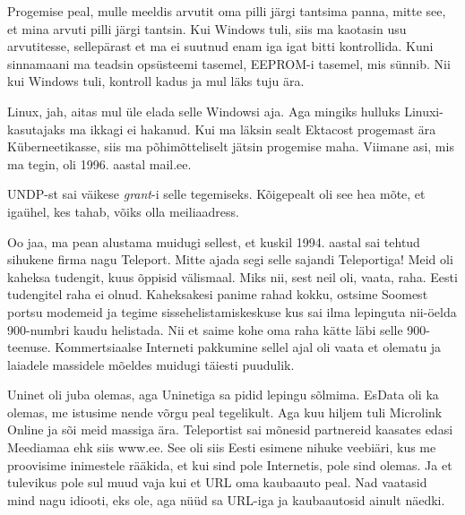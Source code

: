 
Progemise peal, mulle meeldis arvutit oma pilli järgi tantsima panna, mitte see, et mina arvuti pilli järgi tantsin. Kui  Windows tuli, siis ma kaotasin usu arvutitesse, sellepärast et ma ei suutnud enam iga igat bitti kontrollida. Kuni sinnamaani ma teadsin opsüsteemi tasemel,  EEPROM-i tasemel, mis sünnib. Nii kui Windows tuli, kontroll kadus ja mul läks tuju ära.


Linux, jah, aitas mul üle elada selle Windowsi aja. Aga mingiks hulluks Linuxi-kasutajaks ma ikkagi ei hakanud. Kui ma läksin sealt Ektacost progemast ära Küberneetikasse, siis ma põhimõtteliselt jätsin progemise maha. Viimane asi, mis ma tegin, oli 1996. aastal mail.ee. 


UNDP-st sai  väikese \emph{grant}-i selle tegemiseks. Kõigepealt oli see hea mõte, et igaühel, kes tahab, võiks olla meiliaadress. 

Oo jaa, ma pean alustama muidugi sellest, et kuskil 1994. aastal sai tehtud sihukene firma nagu Teleport. Mitte ajada segi selle sajandi Teleportiga! Meid oli kaheksa tudengit, kuus õppisid välismaal. Miks nii, sest neil oli, vaata, raha. Eesti tudengitel raha ei olnud. Kaheksakesi panime rahad kokku, ostsime Soomest portsu modemeid ja tegime  sissehelistamiskeskuse kus sai ilma lepinguta nii-öelda 900-numbri kaudu helistada. Nii et saime kohe oma raha kätte läbi selle 900-teenuse. Kommertsiaalse Interneti pakkumine sellel ajal oli vaata et olematu ja laiadele massidele mõeldes muidugi täiesti puudulik. 


Uninet oli juba olemas, aga Uninetiga sa pidid lepingu sõlmima. EsData oli ka olemas, me istusime nende võrgu peal tegelikult. Aga kuu hiljem tuli Microlink Online ja sõi meid massiga ära.  Teleportist sai mõnesid partnereid kaasates edasi Meediamaa ehk siis www.ee. See oli siis Eesti esimene nihuke veebiäri, kus me proovisime inimestele rääkida, et kui sind pole Internetis, pole sind olemas. Ja et tulevikus pole sul muud vaja kui et URL oma kaubaauto peal. Nad vaatasid mind nagu idiooti, eks ole, aga nüüd sa URL-iga ja kaubaautosid ainult näedki. 


